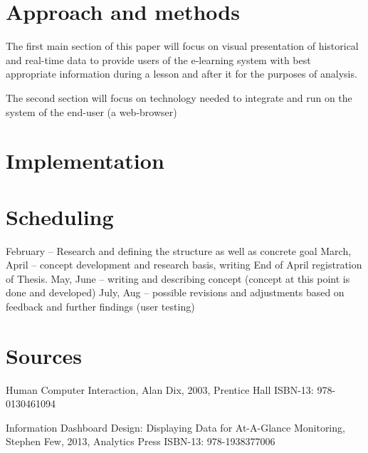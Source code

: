 \section{Approach and methods}

The first main section of this paper will focus on visual presentation of historical and real-time data to provide users of the e-learning system with best appropriate information during a lesson and after it for the purposes of analysis.

The second section will focus on technology needed to integrate and run on the system of the end-user (a web-browser)

\section{Implementation}

\section{Scheduling}
February – Research and defining the structure as well as concrete goal
March, April – concept development and research basis, writing
End of April registration of Thesis.
May, June – writing and describing concept (concept at this point is done and developed)
July, Aug – possible revisions and adjustments based on feedback and further findings (user testing)

\section{Sources}

Human Computer Interaction, Alan Dix, 2003, Prentice Hall
ISBN-13: 978-0130461094

Information Dashboard Design: Displaying Data for At-A-Glance Monitoring, Stephen Few, 2013, Analytics Press
ISBN-13: 978-1938377006

